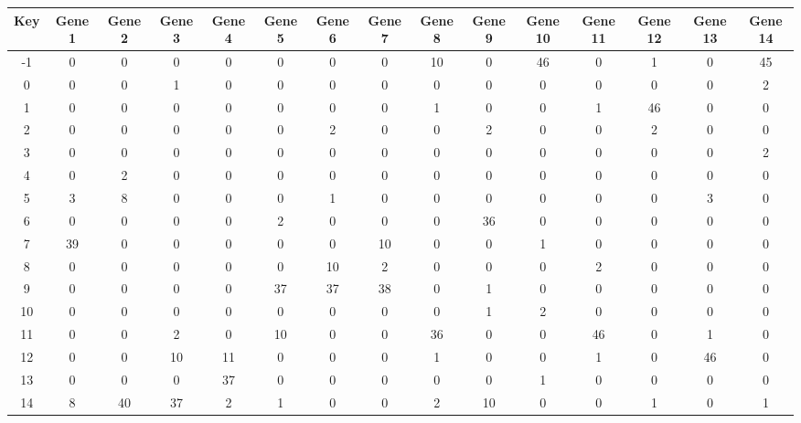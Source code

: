 \begin{tabular}{|c|c|c|c|c|c|c|c|c|c|c|c|c|c|c|}
\hline
Key & Gene 1 & Gene 2 & Gene 3 & Gene 4 & Gene 5 & Gene 6 & Gene 7 & Gene 8 & Gene 9 & Gene 10 & Gene 11 & Gene 12 & Gene 13 & Gene 14 \\
\hline
-1 & 0 & 0 & 0 & 0 & 0 & 0 & 0 & 10 & 0 & 46 & 0 & 1 & 0 & 45 \\
0 & 0 & 0 & 1 & 0 & 0 & 0 & 0 & 0 & 0 & 0 & 0 & 0 & 0 & 2 \\
1 & 0 & 0 & 0 & 0 & 0 & 0 & 0 & 1 & 0 & 0 & 1 & 46 & 0 & 0 \\
2 & 0 & 0 & 0 & 0 & 0 & 2 & 0 & 0 & 2 & 0 & 0 & 2 & 0 & 0 \\
3 & 0 & 0 & 0 & 0 & 0 & 0 & 0 & 0 & 0 & 0 & 0 & 0 & 0 & 2 \\
4 & 0 & 2 & 0 & 0 & 0 & 0 & 0 & 0 & 0 & 0 & 0 & 0 & 0 & 0 \\
5 & 3 & 8 & 0 & 0 & 0 & 1 & 0 & 0 & 0 & 0 & 0 & 0 & 3 & 0 \\
6 & 0 & 0 & 0 & 0 & 2 & 0 & 0 & 0 & 36 & 0 & 0 & 0 & 0 & 0 \\
7 & 39 & 0 & 0 & 0 & 0 & 0 & 10 & 0 & 0 & 1 & 0 & 0 & 0 & 0 \\
8 & 0 & 0 & 0 & 0 & 0 & 10 & 2 & 0 & 0 & 0 & 2 & 0 & 0 & 0 \\
9 & 0 & 0 & 0 & 0 & 37 & 37 & 38 & 0 & 1 & 0 & 0 & 0 & 0 & 0 \\
10 & 0 & 0 & 0 & 0 & 0 & 0 & 0 & 0 & 1 & 2 & 0 & 0 & 0 & 0 \\
11 & 0 & 0 & 2 & 0 & 10 & 0 & 0 & 36 & 0 & 0 & 46 & 0 & 1 & 0 \\
12 & 0 & 0 & 10 & 11 & 0 & 0 & 0 & 1 & 0 & 0 & 1 & 0 & 46 & 0 \\
13 & 0 & 0 & 0 & 37 & 0 & 0 & 0 & 0 & 0 & 1 & 0 & 0 & 0 & 0 \\
14 & 8 & 40 & 37 & 2 & 1 & 0 & 0 & 2 & 10 & 0 & 0 & 1 & 0 & 1 \\
\hline
\end{tabular}